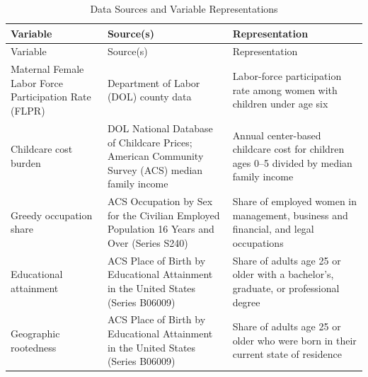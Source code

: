 \documentclass[
  letterpaper,
  DIV=11,
  numbers=noendperiod]{scrartcl}
\begin{document}
\begin{longtable}[]{@{}
  >{\raggedright\arraybackslash}p{}
  >{\raggedright\arraybackslash}p{}
  >{\raggedright\arraybackslash}p{}@{}}
\caption{Data Sources and Variable
Representations}\label{tbl-0}\tabularnewline
\toprule\noalign{}
\begin{minipage}[b]{\linewidth}\raggedright
Variable
\end{minipage} & \begin{minipage}[b]{\linewidth}\raggedright
Source(s)
\end{minipage} & \begin{minipage}[b]{\linewidth}\raggedright
Representation
\end{minipage} \\
\midrule\noalign{}
\endfirsthead
\toprule\noalign{}
\begin{minipage}[b]{\linewidth}\raggedright
Variable
\end{minipage} & \begin{minipage}[b]{\linewidth}\raggedright
Source(s)
\end{minipage} & \begin{minipage}[b]{\linewidth}\raggedright
Representation
\end{minipage} \\
\midrule\noalign{}
\endhead
\bottomrule\noalign{}
\endlastfoot
Maternal Female Labor Force Participation Rate (FLPR) & Department of
Labor (DOL) county data & Labor-force participation rate among women
with children under age six \\
Childcare cost burden & DOL National Database of Childcare Prices;
American Community Survey (ACS) median family income & Annual
center-based childcare cost for children ages 0--5 divided by median
family income \\
Greedy occupation share & ACS Occupation by Sex for the Civilian
Employed Population 16 Years and Over (Series S240) & Share of employed
women in management, business and financial, and legal occupations \\
Educational attainment & ACS Place of Birth by Educational Attainment in
the United States (Series B06009) & Share of adults age 25 or older with
a bachelor's, graduate, or professional degree \\
Geographic rootedness & ACS Place of Birth by Educational Attainment in
the United States (Series B06009) & Share of adults age 25 or older who
were born in their current state of residence \\
\end{longtable}
\end{document}
